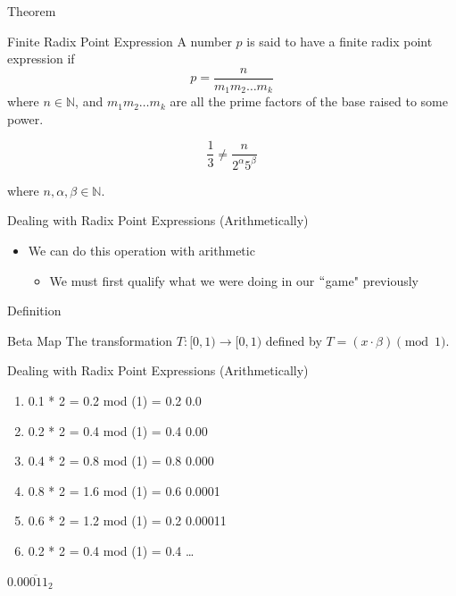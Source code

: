 \documentclass{beamer}
\begin{document}
\begin{frame}{Theorem}
  \begin{block}{Finite Radix Point Expression} \pause
    A number $p$ is said to have a finite radix point expression if $$p=\frac{n}{m_1 m_2\dots m_k}$$ where $n\in\mathbb{N}$, and $m_1 m_2 \dots m_k$ are all the prime factors of the base raised to some power. 
  \end{block}\pause

  \begin{example}[1/3 in Base 10]
    $$\frac{1}{3} \neq \frac{n}{2^\alpha 5^\beta}$$

    where $n,\alpha,\beta\in\mathbb{N}$.
  \end{example}
\end{frame}

\begin{frame}{Dealing with Radix Point Expressions (Arithmetically)}
  \begin{itemize}
    \item We can do this operation with arithmetic \pause
      \begin{itemize}
        \item We must first qualify what we were doing in our $``$game" previously
      \end{itemize}
  \end{itemize}
\end{frame}


\begin{frame}{Definition}
  \begin{block}{Beta Map}
    The transformation $T:[0,1)\to[0,1)$ defined by $T=(x\cdot\beta)\pmod{1}$.
  \end{block}
\end{frame}

\begin{frame}{Dealing with Radix Point Expressions (Arithmetically)}
  \begin{example}\pause
    \begin{enumerate}
      \item[] 0.1 * 2 = 0.2  mod (1) = 0.2 \hfill 0.0\pause
      \item[] 0.2 * 2 = 0.4  mod (1) = 0.4 \hfill 0.00\pause
      \item[] 0.4 * 2 = 0.8  mod (1) = 0.8 \hfill 0.000\pause
      \item[] 0.8 * 2 = 1.6  mod (1) = 0.6 \hfill 0.0001\pause
      \item[] 0.6 * 2 = 1.2  mod (1) = 0.2 \hfill 0.00011\pause
      \item[] 0.2 * 2 = 0.4  mod (1) = 0.4 \hfill\dots\pause
    \end{enumerate}
    \hfill $0.0\overline{0011}_2$
  \end{example}
\end{frame}
\end{document}
